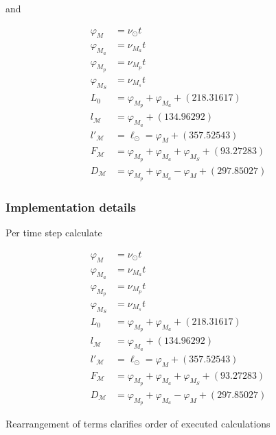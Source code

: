 \documentclass{article}
\begin{document}
and

\begin{equation}
\begin{array}{ll}
\varphi_{M}&=\nu_\odot t\\
\varphi_{M_a}&=\nu_{M_a}t\\
\varphi_{M_p}&=\nu_{M_p}t\\
\varphi_{M_S}&=\nu_{M_s}t\\
L_0&=\varphi_{M_p}+\varphi_{M_a}+ (218.31617)\\
l_{\mathcal M}&=\varphi_{M_a}+ (134.96292)\\
l'_{\mathcal M}&=\ell_{\odot}=\varphi_M+ (357.52543)\\
F_{\mathcal M}&=\varphi_{M_p}+\varphi_{M_a}+\varphi_{M_S}+ (93.27283)\\
D_{\mathcal M}&=\varphi_{M_p}+\varphi_{M_a}-\varphi_{M}+ (297.85027)
\end{array}
\end{equation}

\subsubsection{Implementation details}

Per time step calculate

\begin{equation}
\begin{array}{ll}
\varphi_{M}&=\nu_\odot t\\
\varphi_{M_a}&=\nu_{M_a}t\\
\varphi_{M_p}&=\nu_{M_p}t\\
\varphi_{M_S}&=\nu_{M_s}t\\
L_0&=\varphi_{M_p}+\varphi_{M_a}+(218.31617)\\
l_{\mathcal M}&=\varphi_{M_a}+(134.96292)\\
l'_{\mathcal M}&=\ell_{\odot}=\varphi_M+ (357.52543)\\
F_{\mathcal M}&=\varphi_{M_p}+\varphi_{M_a}+\varphi_{M_S}+ (93.27283)\\
D_{\mathcal M}&=\varphi_{M_p}+\varphi_{M_a}-\varphi_{M}+  (297.85027)
\end{array}
\end{equation}

Rearrangement of terms clarifies order of executed calculations
\end{document}
